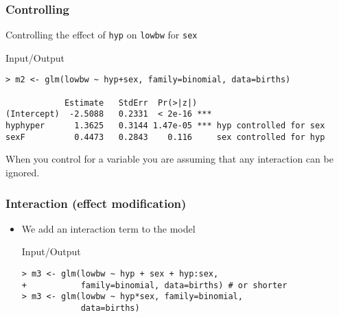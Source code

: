 \begin{frame}[fragile]\frametitle{Controlling}
Controlling the effect of \texttt{hyp} on \texttt{lowbw} for \texttt{sex}\footnotesize
\begin{exampleblock}{Input/Output}
\begin{verbatim}
> m2 <- glm(lowbw ~ hyp+sex, family=binomial, data=births)

            Estimate   StdErr  Pr(>|z|)    
(Intercept)  -2.5088   0.2331  < 2e-16 ***
hyphyper      1.3625   0.3144 1.47e-05 *** hyp controlled for sex
sexF          0.4473   0.2843    0.116     sex controlled for hyp
\end{verbatim}
\end{exampleblock}
\normalsize
When you control for a variable you are assuming that any interaction can be ignored.
\end{frame}


\begin{frame}[fragile]\frametitle{Interaction (effect modification)}
\begin{itemize}
\item We add an interaction term to the model\small
  \begin{exampleblock}{Input/Output}
\begin{verbatim}
> m3 <- glm(lowbw ~ hyp + sex + hyp:sex, 
+           family=binomial, data=births) # or shorter
> m3 <- glm(lowbw ~ hyp*sex, family=binomial, 
            data=births)
\end{verbatim}
  \end{exampleblock}
\end{itemize}
\end{frame}

